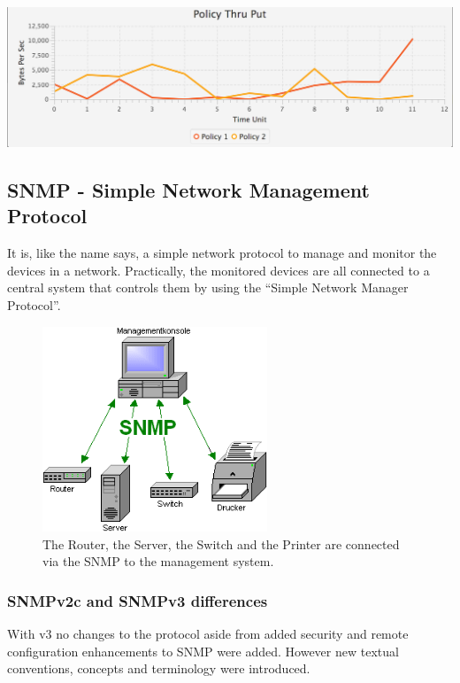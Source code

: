 \documentclass[11pt, a4paper]{article}
\begin{document}
\includegraphics[width=\textwidth]{images/linechart.png}


\subsection{SNMP - Simple Network Management Protocol}

It is, like the name says, a simple network protocol to manage and monitor the devices in a network. Practically, the monitored devices are all connected to a central system that controls them by using the “Simple Network Manager Protocol”.

\begin{figure}[h!]
	\centering
	\includegraphics[width=0.6\textwidth]{images/SNMP-Managementkonsole.png}
	\caption{The Router, the Server, the Switch and the Printer are connected via the SNMP to the management system.}
\end{figure}



\subsubsection{SNMPv2c and SNMPv3 differences}

With v3 no changes to the protocol aside from added security and remote configuration enhancements to SNMP were added. However new textual conventions, concepts and terminology were introduced.
\end{document}
